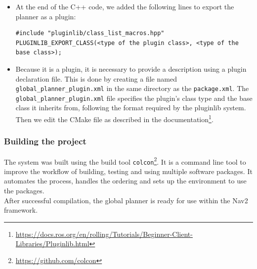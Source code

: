\begin{itemize}
\begin{itemize}
		\item \texttt{deactivate()}: Called when the node enters \texttt{on\_deactivate} state. This method is used for implementing operations which are necessary before planner goes to an inactive state. In our case, this method is not used and is left empty.
		\item \texttt{cleanup()}: Called when the node enters \texttt{on\_cleanup} state. This method is used for cleaning up resources which are created for the planner. In our case we destroy the allocated memory used by \texttt{state\_map} and \texttt{dstar}. 
		\item \texttt{createPlan()}: Invoked when the planner server requests a global plan between a start and goal pose. It requires the start and goal position as\\ \texttt{geometry\_msgs::msg::PoseStamped} and returns a path \texttt{nav\_msgs::msg::Path}. It replaces the \texttt{makePlan} used in ROS 1.
	\end{itemize}
	\item At the end of the C++ code,  we added the following lines to export the planner as a plugin:\\
\begin{listing} [ht!]
\begin{verbatim} 
#include "pluginlib/class_list_macros.hpp"
PLUGINLIB_EXPORT_CLASS(<type of the plugin class>, <type of the base class>);
\end{verbatim}
\end{listing}
	\item Because it is a plugin, it is necessary to provide a description using a plugin declaration file. This is done by creating a file named \texttt{global\_planner\_plugin.xml} in the same directory as the \texttt{package.xml}.
	The \texttt{global\_planner\_plugin.xml} file specifies the plugin's class type and the base class it inherits from, following the format required by the pluginlib system. Then we edit the CMake file as described in the documentation\footnote{\href{https://docs.ros.org/en/rolling/Tutorials/Beginner-Client-Libraries/Pluginlib.html}{https://docs.ros.org/en/rolling/Tutorials/Beginner-Client-Libraries/Pluginlib.html}}.
\end{itemize}
\subsubsection{Building the project}
The system was built using the build tool \texttt{colcon}\footnote{\href{https://github.com/colcon}{https://github.com/colcon}}. It is a command line tool to improve the workflow of building, testing and using multiple software packages. It automates the process, handles the ordering and sets up the environment to use the packages.\\
After successful compilation, the global planner is ready for use within the Nav2 framework.
\newpage
